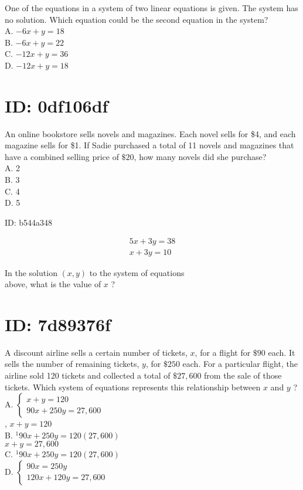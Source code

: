 One of the equations in a system of two linear equations is given. The system has no solution. Which equation could be the second equation in the system?\\
A. $-6 x+y=18$\\
B. $-6 x+y=22$\\
C. $-12 x+y=36$\\
D. $-12 x+y=18$

\section*{ID: 0df106df}
An online bookstore sells novels and magazines. Each novel sells for \$4, and each magazine sells for \$1. If Sadie purchased a total of 11 novels and magazines that have a combined selling price of $\$ 20$, how many novels did she purchase?\\
A. 2\\
B. 3\\
C. 4\\
D. 5

ID: b544a348

$$
\begin{array}{r}
5 x+3 y=38 \\
x+3 y=10
\end{array}
$$

In the solution $(x, y)$ to the system of equations\\
above, what is the value of $x$ ?

\section*{ID: 7d89376f}
A discount airline sells a certain number of tickets, $x$, for a flight for $\$ 90$ each. It sells the number of remaining tickets, $y$, for $\$ 250$ each. For a particular flight, the airline sold 120 tickets and collected a total of $\$ 27,600$ from the sale of those tickets. Which system of equations represents this relationship between $x$ and $y$ ?\\
A. $\left\{\begin{array}{l}x+y=120 \\ 90 x+250 y=27,600\end{array}\right.$\\
, $x+y=120$\\
B. ${ }^{1} 90 x+250 y=120(27,600)$\\
$x+y=27,600$\\
C. ${ }^{1} 90 x+250 y=120(27,600)$\\
D. $\left\{\begin{array}{l}90 x=250 y \\ 120 x+120 y=27,600\end{array}\right.$


